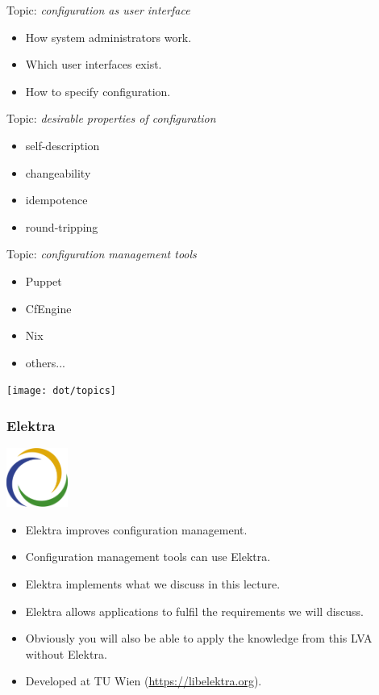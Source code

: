 \begin{frame}
	Topic: \textit{configuration as user interface}
	\begin{itemize}
		\item How system administrators work.
		\item Which user interfaces exist.
		\item How to specify configuration.
	\end{itemize}
\end{frame}

\begin{frame}
	Topic: \textit{desirable properties of configuration}
	\begin{itemize}
		\item self-description
		\item changeability
		\item idempotence
		\item round-tripping
	\end{itemize}
\end{frame}

\begin{frame}
	Topic: \textit{configuration management tools}
	\begin{itemize}
		\item Puppet
		\item CfEngine
		\item Nix
		\item others...
	\end{itemize}
\end{frame}


\begin{frame}
	\hspace*{-1cm}\texttt{[image: dot/topics]}
\end{frame}

\begin{frame}
	\frametitle{Elektra}
	\hfill \includegraphics[width=2cm]{../figures/logo}
	\vspace{-1cm}
	\begin{itemize}
		\item Elektra improves configuration management.
		\item Configuration management tools can use Elektra.
		\item Elektra implements what we discuss in this lecture.
		\item Elektra allows applications to fulfil the requirements we will discuss.
		\item Obviously you will also be able to apply the knowledge from this LVA without Elektra.
		\item Developed at TU Wien (\url{https://libelektra.org}).
	\end{itemize}
\end{frame}


